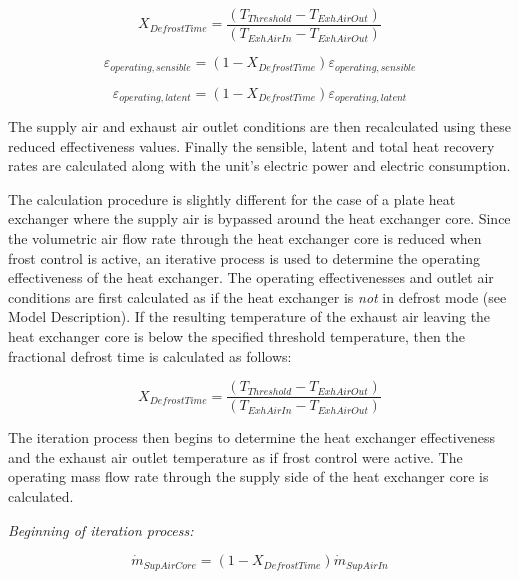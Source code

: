 \begin{equation}
{X_{DefrostTime}} = \frac{{({T_{Threshold}} - {T_{ExhAirOut}})}}{{({T_{ExhAirIn}} - {T_{ExhAirOut}})}}
\end{equation}

\begin{equation}
{\varepsilon_{operating,sensible}} = (1 - {X_{DefrostTime}}){\varepsilon_{operating,sensible}}
\end{equation}

\begin{equation}
{\varepsilon_{operating,latent}} = (1 - {X_{DefrostTime}}){\varepsilon_{operating,latent}}
\end{equation}

The supply air and exhaust air outlet conditions are then recalculated using these reduced effectiveness values. Finally the sensible, latent and total heat recovery rates are calculated along with the unit's electric power and electric consumption.

The calculation procedure is slightly different for the case of a plate heat exchanger where the supply air is bypassed around the heat exchanger core. Since the volumetric air flow rate through the heat exchanger core is reduced when frost control is active, an iterative process is used to determine the operating effectiveness of the heat exchanger. The operating effectivenesses and outlet air conditions are first calculated as if the heat exchanger is \emph{not} in defrost mode (see Model Description). If the resulting temperature of the exhaust air leaving the heat exchanger core is below the specified threshold temperature, then the fractional defrost time is calculated as follows:

\begin{equation}
{X_{DefrostTime}} = \frac{{({T_{Threshold}} - {T_{ExhAirOut}})}}{{({T_{ExhAirIn}} - {T_{ExhAirOut}})}}
\end{equation}

The iteration process then begins to determine the heat exchanger effectiveness and the exhaust air outlet temperature as if frost control were active. The operating mass flow rate through the supply side of the heat exchanger core is calculated.

\emph{Beginning of iteration process:}

\begin{equation}
{\dot{m}_{SupAirCore}} = (1 - {X_{DefrostTime}}){\dot{m}_{SupAirIn}}
\end{equation}

